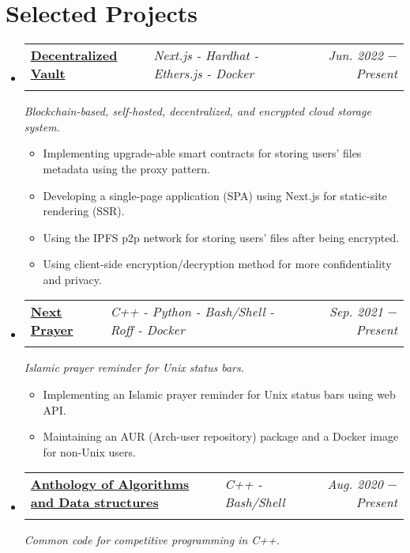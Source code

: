 \documentclass[letterpaper, 11pt]{article}
\makeatletter
\newcommand{\subexperience}[1] {
\item\small
  {#1}
  \vspace{-2pt}
}
\newcommand{\project}[6] {
  \vspace{-1pt}\item
  \begin{tabular*}{0.97\textwidth}[t]{ll@{\extracolsep{\fill}}r}
    #1 \href{#4}{\textbf{\color{RoyalBlue}#2}} \textbar{ } & \textit{#5} & \textit{\small #3} \\
    \vspace{-10pt}
  \end{tabular*}
  \textit{\small #6}
  \vspace{-8pt}
}
\newcommand{\subproject}[1] {
\item\small
  {#1}
  \vspace{-2pt}
}
\makeatother
\begin{document}

\section{Selected Projects}
\begin{itemize}[leftmargin=*]
  \project
  {\faIcon{cloud}}
  {Decentralized Vault}{Jun. 2022 $-$ Present}
  {https://devault.vercel.app/}{Next.js - Hardhat - Ethers.js - Docker}
  {Blockchain-based, self-hosted, decentralized, and encrypted cloud storage system.}

  \begin{itemize}
    \subproject
    {Implementing upgrade-able smart contracts for storing users' files metadata using the proxy pattern.}
    \subproject
    {Developing a single-page application (SPA) using Next.js for static-site rendering (SSR).}
    \subproject
    {Using the IPFS p2p network for storing users' files after being encrypted.}
    \subproject
    {Using client-side encryption/decryption method for more confidentiality and privacy.}
  \end{itemize}\vspace{-4pt}

  \project
  {\faIcon{mosque}}
  {Next Prayer}{Sep. 2021 $-$ Present}
  {https://github.com/AbdeltwabMF/nxprayer}{C++ - Python - Bash/Shell - Roff - Docker}
  {Islamic prayer reminder for Unix status bars.}

  \begin{itemize}
    \subproject
    {Implementing an Islamic prayer reminder for Unix status bars using web API.}
    \subproject
    {Maintaining an AUR (Arch-user repository) package and a Docker image for non-Unix users.}
  \end{itemize}\vspace{-4pt}

  \project
  {\faIcon{laptop-code}}
  {Anthology of Algorithms and Data structures}{Aug. 2020 $-$ Present}
  {https://github.com/AbdeltwabMF/Anthology-of-Algorithms-and-Data-structures}{C++ - Bash/Shell}
  {Common code for competitive programming in C++.}


\end{itemize}
\end{document}
